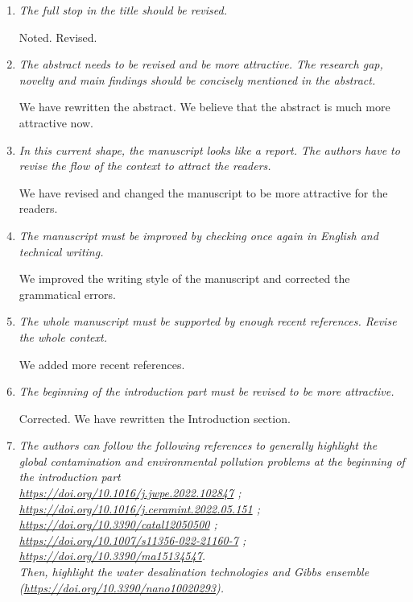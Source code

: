 \documentclass[12pt]{dinbrief}
\begin{document}
\textit{}
\begin{enumerate}
\item \textit{The full stop in the title should be revised.}

Noted. Revised.
\item \textit{The abstract needs to be revised and be more attractive. The research gap, novelty and main findings should be concisely mentioned in the abstract.}

We have rewritten the abstract. We believe that the abstract is much more attractive now.
\item \textit{In this current shape, the manuscript looks like a report. The authors have to revise the flow of the context to attract the readers.}

We have revised and changed the manuscript to be more attractive for the readers. 
\item \textit{The manuscript must be improved by checking once again in English and technical writing. }

We improved the writing style of the manuscript and corrected the grammatical errors.

\item \textit{The whole manuscript must be supported by enough recent references. Revise the whole context.}

We added more recent references.
\item \textit{The beginning of the introduction part must be revised to be more attractive.}

Corrected. We have rewritten the Introduction section.
\item \textit{The authors can follow the following references to generally highlight the global contamination and environmental pollution problems at the beginning of the introduction part \\ \href{https://doi.org/10.1016/j.jwpe.2022.102847}{https://doi.org/10.1016/j.jwpe.2022.102847} ;\\
\href{https://doi.org/10.1016/j.ceramint.2022.05.151}{https://doi.org/10.1016/j.ceramint.2022.05.151} ;\\
\href{https://doi.org/10.3390/catal12050500}{https://doi.org/10.3390/catal12050500} ; \\
\href{https://doi.org/10.1007/s11356-022-21160-7}{https://doi.org/10.1007/s11356-022-21160-7} ;\\
\href{https://doi.org/10.3390/ma15134547}{https://doi.org/10.3390/ma15134547}. \\
Then, highlight the water desalination technologies and Gibbs ensemble\\
(\href{https://doi.org/10.3390/nano10020293}{https://doi.org/10.3390/nano10020293}).}


\end{enumerate}
\end{document}
